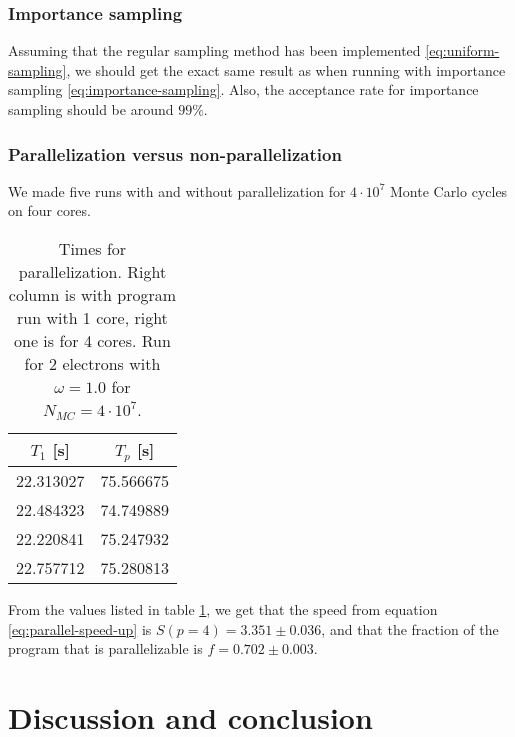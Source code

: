 \documentclass[11pt]{article}
\begin{document}
\subsubsection{Importance sampling}
Assuming that the regular sampling method has been implemented \eqref{eq:uniform-sampling}, we should get the exact same result as when running with importance sampling \eqref{eq:importance-sampling}. Also, the acceptance rate for importance sampling should be around $99\%$\citet{komp2015}.

\subsubsection{Parallelization versus non-parallelization}
We made five runs with and without parallelization for $4\cdot 10^7$ Monte Carlo cycles on four cores.

\begin{table}[H]
	\centering
	\caption{Times for parallelization. Right column is with program run with 1 core, right one is for 4 cores. Run for 2 electrons with $\omega = 1.0$ for $N_{MC}=4\cdot10^7$.}
	\begin{tabular}{c c}
		\\ \hline \hline
		$T_1$ [s]& $T_p$ [s] \\ \hline
		22.313027 & 75.566675 \\
		22.484323 & 74.749889 \\
		22.220841 & 75.247932 \\
		22.757712 & 75.280813 \\
        \hline \hline
	\end{tabular}
	\label{tab:parallelization-times}
\end{table}

From the values listed in table \ref{tab:parallelization-times}, we get that the speed from equation \eqref{eq:parallel-speed-up} is $S(p=4) = 3.351 \pm 0.036$, and that the fraction of the program that is parallelizable is $f = 0.702 \pm 0.003$.



\section{Discussion and conclusion}
\end{document}
